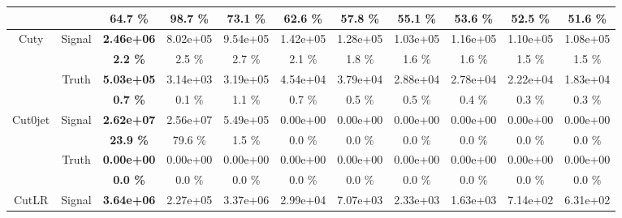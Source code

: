 \begin{landscape}
\begin{table}
\begin{tabular}{|c|c|>{\bfseries}c|c|c|c|c|c|c|c|c|}
                                    &                           & 64.7 \%  & 98.7 \%  & 73.1 \%  & 62.6 \%  & 57.8 \%  & 55.1 \%  & 53.6 \%  & 52.5 \%  & 51.6 \%  \\
    \hline                                                              
    \hline                                                              
    \multirow{4}{*}{Cuty}           & \multirow{2}{*}{Signal}   & 2.46e+06 & 8.02e+05 & 9.54e+05 & 1.42e+05 & 1.28e+05 & 1.03e+05 & 1.16e+05 & 1.10e+05 & 1.08e+05 \\
                                    &                           & 2.2 \%   & 2.5 \%   & 2.7 \%   & 2.1 \%   & 1.8 \%   & 1.6 \%   & 1.6 \%   & 1.5 \%   & 1.5 \%   \\
    \cline{2-11}                                                                                    
                                    & \multirow{2}{*}{Truth}    & 5.03e+05 & 3.14e+03 & 3.19e+05 & 4.54e+04 & 3.79e+04 & 2.88e+04 & 2.78e+04 & 2.22e+04 & 1.83e+04 \\
                                    &                           & 0.7 \%   & 0.1 \%   & 1.1 \%   & 0.7 \%   & 0.5 \%   & 0.5 \%   & 0.4 \%   & 0.3 \%   & 0.3 \%   \\
    \hline                                                              
    \hline                                                              
    \multirow{4}{*}{Cut0jet}        & \multirow{2}{*}{Signal}   & 2.62e+07 & 2.56e+07 & 5.49e+05 & 0.00e+00 & 0.00e+00 & 0.00e+00 & 0.00e+00 & 0.00e+00 & 0.00e+00 \\
                                    &                           & 23.9 \%  & 79.6 \%  & 1.5 \%   & 0.0 \%   & 0.0 \%   & 0.0 \%   & 0.0 \%   & 0.0 \%   & 0.0 \%   \\
    \cline{2-11}                                                                                    
                                    & \multirow{2}{*}{Truth}    & 0.00e+00 & 0.00e+00 & 0.00e+00 & 0.00e+00 & 0.00e+00 & 0.00e+00 & 0.00e+00 & 0.00e+00 & 0.00e+00 \\
                                    &                           & 0.0 \%   & 0.0 \%   & 0.0 \%   & 0.0 \%   & 0.0 \%   & 0.0 \%   & 0.0 \%   & 0.0 \%   & 0.0 \%   \\
    \hline                                                              
    \hline                                                              
    \multirow{4}{*}{CutLR}          & \multirow{2}{*}{Signal}   & 3.64e+06 & 2.27e+05 & 3.37e+06 & 2.99e+04 & 7.07e+03 & 2.33e+03 & 1.63e+03 & 7.14e+02 & 6.31e+02 \\

\end{tabular}
\end{table}
\end{landscape}
